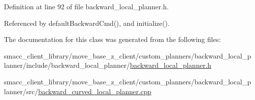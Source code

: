 Definition at line 92 of file backward\+\_\+local\+\_\+planner.\+h.



Referenced by default\+Backward\+Cmd(), and initialize().



The documentation for this class was generated from the following files\+:\begin{DoxyCompactItemize}
\item 
smacc\+\_\+client\+\_\+library/move\+\_\+base\+\_\+z\+\_\+client/custom\+\_\+planners/backward\+\_\+local\+\_\+planner/include/backward\+\_\+local\+\_\+planner/\hyperlink{backward__local__planner_8h}{backward\+\_\+local\+\_\+planner.\+h}\item 
smacc\+\_\+client\+\_\+library/move\+\_\+base\+\_\+z\+\_\+client/custom\+\_\+planners/backward\+\_\+local\+\_\+planner/src/\hyperlink{backward__curved__local__planner_8cpp}{backward\+\_\+curved\+\_\+local\+\_\+planner.\+cpp}\end{DoxyCompactItemize}
